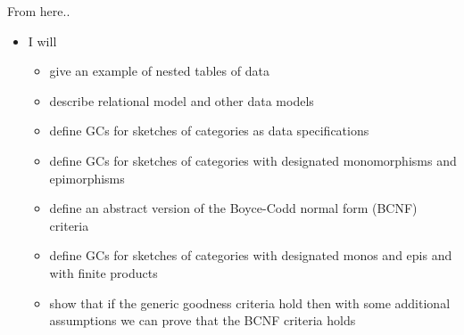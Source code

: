 \begin{frame}{From here..}
\begin{itemize}
\pause \item I will
\begin{itemize}
   \item give an example of nested tables of data
   \item describe relational model  and other data models 
   \pause \item define GCs for sketches of categories as data specifications 
   \pause \item define GCs for sketches of categories with designated monomorphisms and epimorphisms
   \pause \item define an abstract version of the Boyce-Codd normal form (BCNF) criteria 
   \pause \item define GCs for sketches of categories with designated monos and epis and with finite products
  \pause \item  show that if the generic goodness criteria hold then with some additional assumptions we can prove that the BCNF criteria holds
\end{itemize}
\end{itemize}
\end{frame}


